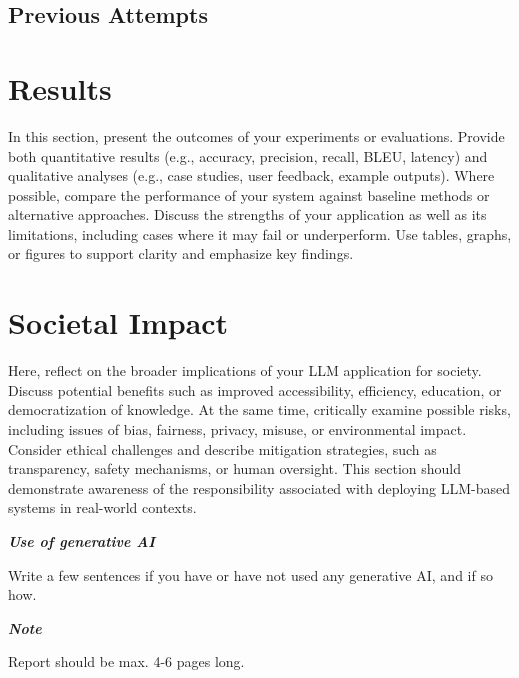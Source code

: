 \documentclass[a4paper,10pt]{article}
\begin{document}
\subsection{Previous Attempts}

\section{Results}
In this section, present the outcomes of your experiments or evaluations. Provide both quantitative results (e.g., accuracy, precision, recall, BLEU, latency) and qualitative analyses (e.g., case studies, user feedback, example outputs). Where possible, compare the performance of your system against baseline methods or alternative approaches. Discuss the strengths of your application as well as its limitations, including cases where it may fail or underperform. Use tables, graphs, or figures to support clarity and emphasize key findings.

\section{Societal Impact}
Here, reflect on the broader implications of your LLM application for society. Discuss potential benefits such as improved accessibility, efficiency, education, or democratization of knowledge. At the same time, critically examine possible risks, including issues of bias, fairness, privacy, misuse, or environmental impact. Consider ethical challenges and describe mitigation strategies, such as transparency, safety mechanisms, or human oversight. This section should demonstrate awareness of the responsibility associated with deploying LLM-based systems in real-world contexts.

	
\hfill \break
\textit{\textbf{Use of generative AI}}

Write a few sentences if you have or have not used any generative AI, and if so how.


\hfill \break
\textit{\textbf{Note}}

Report should be max. 4-6 pages long.

	
\begin{thebibliography}{1}

		
\end{thebibliography}

	
	
%	
%	
%	
\end{document}
